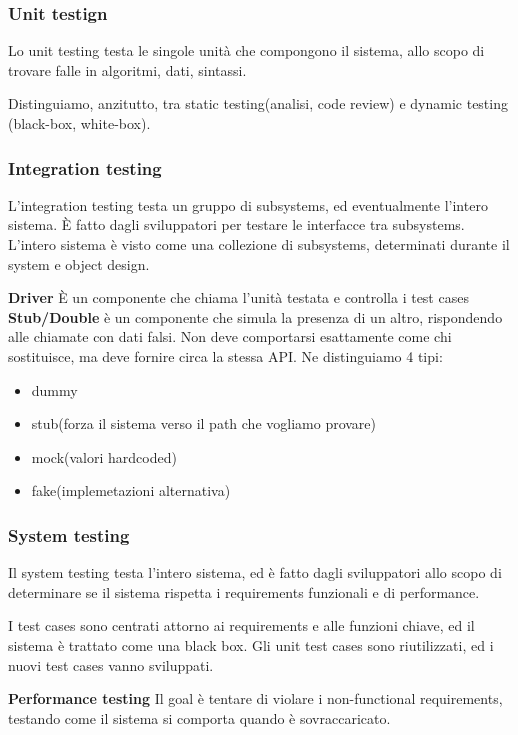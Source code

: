 \documentclass{article}
\begin{document}
\subsubsection{Unit testign}
Lo unit testing testa le singole unità che compongono il sistema, allo scopo di trovare falle in algoritmi,
dati, sintassi.

Distinguiamo,
anzitutto, tra static testing(analisi, code review) e dynamic testing (black-box, white-box).


\subsubsection{Integration testing}

L'integration testing testa un gruppo di subsystems, ed eventualmente l’intero sistema. È fatto dagli
sviluppatori per testare le interfacce tra subsystems. L'intero sistema è visto come una collezione di
subsystems, determinati durante il system e object design.


\textbf{Driver} È un componente che chiama l'unità testata e controlla i test cases
\textbf{Stub/Double} è un componente che simula la presenza di un altro, rispondendo alle chiamate con dati
falsi. Non deve comportarsi esattamente come chi sostituisce, ma deve fornire circa la stessa API. Ne
distinguiamo 4 tipi:
\begin{itemize}
    \item dummy
    \item stub(forza il sistema verso il path che vogliamo provare)
    \item mock(valori hardcoded)
    \item fake(implemetazioni alternativa)
\end{itemize}

\subsubsection{System testing}
Il system testing testa l'intero sistema, ed è fatto dagli sviluppatori allo scopo di determinare se il sistema
rispetta i requirements funzionali e di performance.


I test cases sono centrati attorno ai requirements e alle funzioni
chiave, ed il sistema è trattato come una black box. Gli unit test cases sono riutilizzati, ed i nuovi test
cases vanno sviluppati.




\textbf{Performance testing} Il goal è tentare di violare i non-functional requirements, testando come il sistema
si comporta quando è sovraccaricato.
\end{document}
